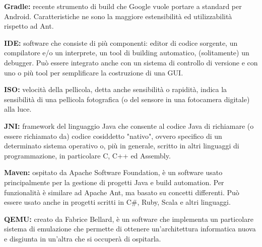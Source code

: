 \textbf{Gradle:} recente strumento di build che Google vuole portare a standard per Android. Caratteristiche ne sono la maggiore estensibilità ed utilizzabilità rispetto ad Ant.

\textbf{IDE:} software che consiste di più componenti: editor di codice sorgente, un compilatore e/o un interprete, un tool di building automatico, (solitamente) un debugger. Può essere integrato anche con un sistema di controllo di versione e con uno o più tool per semplificare la costruzione di una GUI.

\textbf{ISO:} velocità della pellicola, detta anche sensibilità o rapidità, indica la sensibilità di una pellicola fotografica (o del sensore in una fotocamera digitale) alla luce.

\textbf{JNI:} framework del linguaggio Java che consente al codice Java di richiamare (o essere richiamato da) codice cosiddetto "nativo", ovvero specifico di un determinato sistema operativo o, più in generale, scritto in altri linguaggi di programmazione, in particolare C, C++ ed Assembly.

\textbf{Maven:} ospitato da Apache Software Foundation, è un software usato principalmente per la gestione di progetti Java e build automation. Per funzionalità è similare ad Apache Ant, ma basato su concetti differenti. Può essere usato anche in progetti scritti in C\#, Ruby, Scala e altri linguaggi.

\textbf{QEMU:} creato da Fabrice Bellard, è un software che implementa un particolare sistema di emulazione che permette di ottenere un'architettura informatica nuova e disgiunta in un'altra che si occuperà di ospitarla. 

